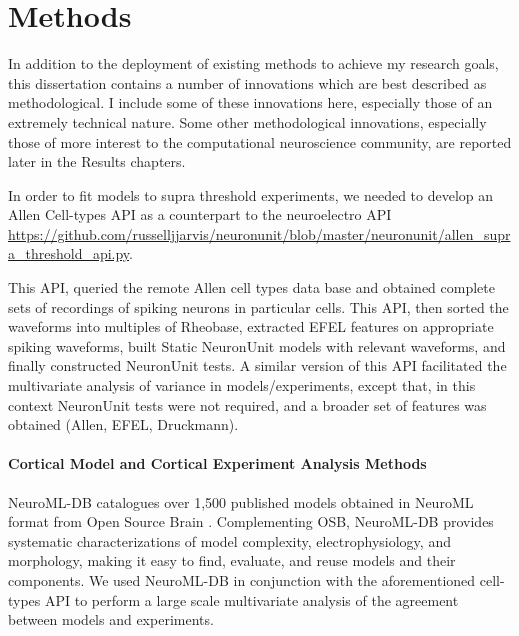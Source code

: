 \chapter{Methods}
In addition to the deployment of existing methods to achieve my research goals, this dissertation contains a number of innovations which are best described as methodological.  I include some of these innovations here, especially those of an extremely technical nature.  Some other methodological innovations, especially those of more interest to the computational neuroscience community, are reported later in the Results chapters.







In order to fit models to supra threshold experiments, we needed to develop an Allen Cell-types API as a counterpart to the neuroelectro API \newline \url{https://github.com/russelljjarvis/neuronunit/blob/master/neuronunit/allen_supra_threshold_api.py}.

This API, queried the remote Allen cell types data base and obtained complete sets of recordings of spiking neurons in particular cells. This API, then sorted the waveforms into multiples of Rheobase, extracted EFEL features on appropriate spiking waveforms, built Static NeuronUnit models with relevant waveforms, and finally constructed NeuronUnit tests. A similar version of this API facilitated the multivariate analysis of variance in models/experiments, except that, in this context NeuronUnit tests were not required, and a broader set of features was obtained (Allen, EFEL, Druckmann).
\subsubsection{Cortical Model and Cortical Experiment Analysis Methods}
NeuroML-DB \cite{birgiolas2016rapid} catalogues over 1,500 published models obtained in NeuroML format from Open Source Brain \cite{gleeson2019open}. Complementing OSB, NeuroML-DB provides systematic characterizations of model complexity, electrophysiology, and morphology, making it easy to find, evaluate, and reuse models and their components. We used NeuroML-DB in conjunction with the aforementioned cell-types API to perform a large scale multivariate analysis of the agreement between models and experiments.

